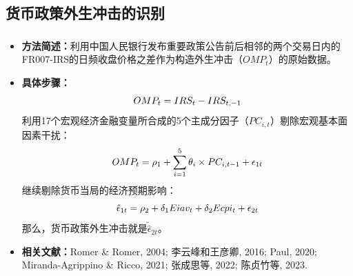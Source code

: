 \documentclass[12pt,aspectratio=169]{ctexbeamer}
\begin{document}
			\subsection{货币政策外生冲击的识别}
			\begin{frame}
				\frametitle{}
					\begin{itemize}
						\justifying
						\normalsize
						\item \textbf{方法简述：}利用中国人民银行发布重要政策公告前后相邻的两个交易日内的FR007-IRS的日频收盘价格之差作为构造外生冲击（$OMP_t$）的原始数据。
						\item \textbf{具体步骤：}
						\vspace{-0mm}
						\[
						OMP_t=IRS_t-IRS_{t,-1}
						\vspace{-0mm}
						\]
						{\footnotesize 利用17个宏观经济金融变量所合成的5个主成分因子（$PC_{i,t}$）剔除宏观基本面因素干扰：}
						\vspace{-3mm}
						\[
						OMP_t=\rho _1+\sum_{i=1}^5{\theta _i\times PC_{i,t-1}}+\epsilon _{1t}
						\vspace{-3mm}
						\]
						{\footnotesize 继续剔除货币当局的经济预期影响：}
						\vspace{-3mm}
						\[
						\hat{\epsilon}_{1t}=\rho _2+\delta _1Eiav_t+\delta _2Ecpi_t+\epsilon _{2t}
						\vspace{-2mm}
						\]
						{\footnotesize 那么，货币政策外生冲击就是$\tilde{\hat{\epsilon}}_{2t}$。}
						\item \textbf{相关文献：}Romer \& Romer, 2004; 李云峰和王彦卿, 2016; Paul, 2020; Miranda-Agrippino \& Ricco, 2021; 张成思等, 2022; 陈贞竹等, 2023.
					\end{itemize}
			\end{frame}
\end{document}
